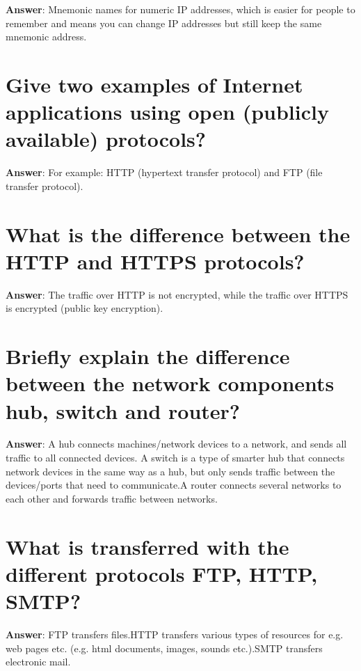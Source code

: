 \documentclass[a4paper,11pt,oneside]{book}
\begin{document}
\begin{sloppypar}
\textbf{Answer}: Mnemonic names for numeric IP addresses, which is easier for people to remember and means you can change IP addresses but still keep the same mnemonic address.



\section{Give two examples of Internet applications using open (publicly available) protocols?}

\label{q:151:sa:en:True}

\textbf{Answer}: For example: HTTP (hypertext transfer protocol) and FTP (file transfer protocol).



\section{What is the difference between the HTTP and HTTPS protocols?}

\label{q:152:sa:en:True}

\textbf{Answer}: The traffic over HTTP is not encrypted, while the traffic over HTTPS is encrypted (public key encryption).



\section{Briefly explain the difference between the network components hub, switch and router?}

\label{q:153:sa:en:True}

\textbf{Answer}: A hub connects machines/network devices to a network, and sends all traffic to all connected devices. A switch is a type of smarter hub that connects network devices in the same way as a hub, but only sends traffic between the devices/ports that need to communicate.A router connects several networks to each other and forwards traffic between networks.



\section{What is transferred with the different protocols FTP, HTTP, SMTP?}

\label{q:154:sa:en:True}

\textbf{Answer}: FTP transfers files.HTTP transfers various types of resources for e.g. web pages etc. (e.g. html documents, images, sounds etc.).SMTP transfers electronic mail.




\end{sloppypar}
\end{document}
